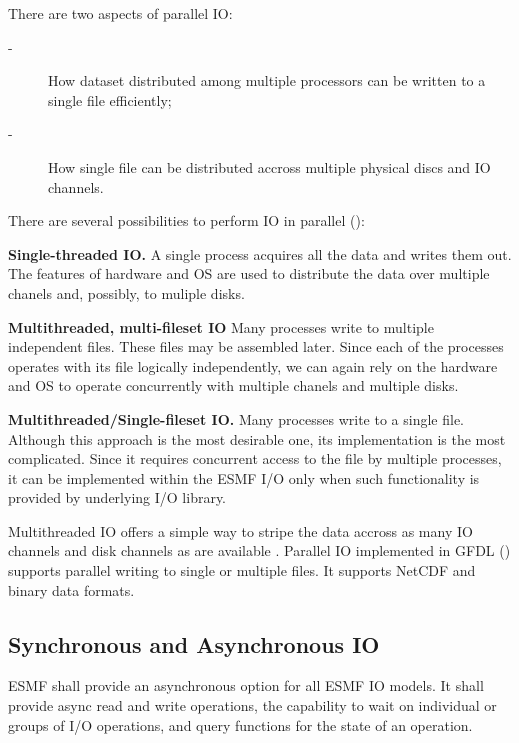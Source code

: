 There are two aspects of  parallel IO:

\begin{description}
\item[-] How dataset distributed among multiple processors can be
written to a single file efficiently;

\item[-] How single file can be distributed accross multiple physical
discs and IO channels.
\end{description}
 
There are several possibilities to perform IO in parallel (\cite{MPI-2}):
\begin{description}
\item {\bf Single-threaded IO.} A single process acquires all the data and
writes them out. The features of hardware and OS are used to distribute the 
data over multiple chanels and, possibly, to muliple disks.

\item {\bf Multithreaded, multi-fileset IO} Many processes write to
multiple independent files. These files may be assembled later. Since each of 
the processes operates with its file logically independently, we can again 
rely on the hardware and OS to operate concurrently with multiple chanels and 
multiple disks. 
 
\item {\bf Multithreaded/Single-fileset IO.} Many processes write to a
single file. Although this approach is the most desirable one, its 
implementation is the most complicated. Since it requires concurrent access 
to the file by multiple processes, it can be implemented within the ESMF I/O 
only when such functionality is provided by underlying I/O library. 
\end{description}

Multithreaded IO offers a simple way to stripe the data accross as many
IO channels and disk channels as are available \cite{MPI-2, 
Balaji_Parallel_IO_1999, Balaji_Parallel_IO_2000}. Parallel IO implemented in 
GFDL (\cite{mpp_io}) supports parallel writing to single or multiple files. 
It supports NetCDF and binary data formats.

\subsection{Synchronous and Asynchronous IO}

ESMF shall provide an asynchronous option for all ESMF IO models.  It
shall provide async read and write operations, the capability to wait
on individual or groups of I/O operations, and query functions for the
state of an operation.


